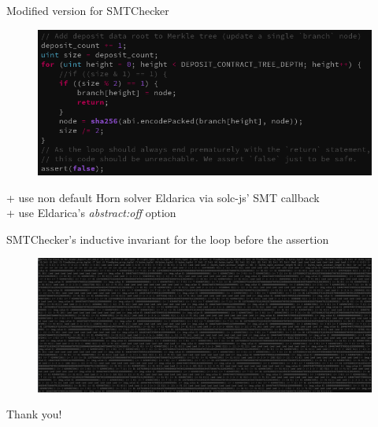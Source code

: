 \documentclass[aspectratio=169,10pt]{beamer}
\begin{document}
\begin{frame}[fragile]
\begin{center}
Modified version for SMTChecker
\begin{figure}
\includegraphics[scale=0.25]{images/deposit_smtchecker_code}
\end{figure}
+ use non default Horn solver Eldarica via solc-js' SMT callback\\
+ use Eldarica's \emph{abstract:off} option
\end{center}
\end{frame}

\begin{frame}[fragile]
\begin{center}
SMTChecker's inductive invariant for the loop before the assertion
\begin{figure}
\includegraphics[scale=0.2]{images/deposit_pass_smtchecker_proof}
\end{figure}
\end{center}
\end{frame}

\begin{frame}
\begin{center}
Thank you!
\end{center}
\end{frame}
 
\end{document}
